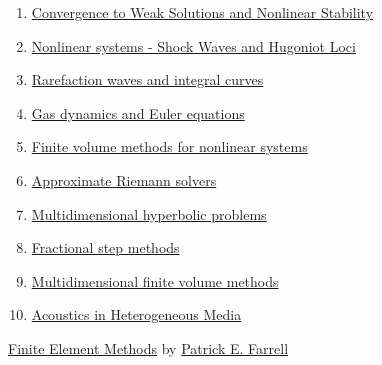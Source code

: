 \documentclass[11pt]{article}
\begin{document}
\begin{enumerate}
	\item \href{https://mp.weixin.qq.com/s/q_4G35hsGqc-Lc7AL8dSqw}{Convergence to Weak Solutions and Nonlinear Stability}	%
	\item \href{https://mp.weixin.qq.com/s/s1VXAORVgAqX46NljJkutQ}{Nonlinear systems - Shock Waves and Hugoniot Loci}	%
	\item \href{https://mp.weixin.qq.com/s/t29iY8mWrpmYoqqzy4ihaQ}{Rarefaction waves and integral curves}	%
	\item \href{https://mp.weixin.qq.com/s/YplLOv8ap0Hd0QRfNL2rGw}{Gas dynamics and Euler equations}	%
	\item \href{https://mp.weixin.qq.com/s/-47qZ8945-OBiTqMZHuztQ}{Finite volume methods for nonlinear systems}	%
	\item \href{https://mp.weixin.qq.com/s/x9bgq7QhyurGpwi2hIs3wQ}{Approximate Riemann solvers}	%
	\item \href{https://mp.weixin.qq.com/s/FDZ8-vNbHevhXyT1Osor_g}{Multidimensional hyperbolic problems}	%
	\item \href{https://mp.weixin.qq.com/s/0XN06E5tjGMBbkMIZFBb9A}{Fractional step methods}	%
	\item \href{https://mp.weixin.qq.com/s/GMDjgzyoD1YxtU1_9Bvk-Q}{Multidimensional finite volume methods}	%
	\item \href{https://mp.weixin.qq.com/s/RLKxb3c59yKpl16LpPDSYQ}{Acoustics in Heterogeneous Media}	%
\end{enumerate}


\begin{center}
	{\large   \href{https://people.maths.ox.ac.uk/farrellp/femvideos/}{Finite Element Methods}} by {\large \href{https://pefarrell.org/}{Patrick E. Farrell}}
\end{center}
\end{document}
